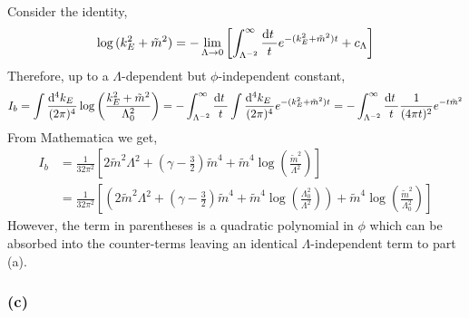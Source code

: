 \documentclass[12pt]{article}
\begin{document}
Consider the identity,
\[ \log{(k_E^2 + \tilde{m}^2)} = - \lim_{\Lambda \to 0} \left[ \int_{\Lambda^{-2}}^\infty \frac{\mathrm{d}t \:}{t} e^{-(k_E^2 + \tilde{m}^2) t} + c_{\Lambda} \right] \]
Therefore, up to a $\Lambda$-dependent but $\phi$-independent constant,
\[ I_b = \int \frac{\mathrm{d}^{4} k_E \:}{(2\pi)^4} \log{\left( \frac{k_E^2 + \tilde{m}^2}{\Lambda_0^2} \right)} = - \int_{\Lambda^{-2}}^{\infty} \frac{\mathrm{d}t \:}{t} \int \frac{\mathrm{d}^{4} k_E \:}{(2\pi)^4} e^{-(k_E^2 + \tilde{m}^2)t} = - \int_{\Lambda^{-2}}^{\infty} \frac{\mathrm{d}t \:}{t} \frac{1}{(4 \pi t)^2} e^{- t \tilde{m}^2} \]
From Mathematica we get,
\begin{align*}
I_b & = \frac{1}{32 \pi^2} \left[ 2 \tilde{m}^2 \Lambda^2 + (\gamma - \tfrac{3}{2}) \tilde{m}^4 + \tilde{m}^4 \log{\left( \frac{\tilde{m}^2}{\Lambda^2} \right)}   \right] 
\\
& = \frac{1}{32 \pi^2} \left[ \left( 2 \tilde{m}^2 \Lambda^2 + (\gamma - \tfrac{3}{2}) \tilde{m}^4 + \tilde{m}^4 \log{\left( \frac{\Lambda_0^2}{\Lambda^2} \right)} \right) + \tilde{m}^4 \log{\left( \frac{\tilde{m}^2}{\Lambda_0^2} \right)}  \right] 
\end{align*}
However, the term in parentheses is a quadratic polynomial in $\phi$ which can be absorbed into the counter-terms leaving an identical $\Lambda$-independent term to part (a). 

\subsubsection*{(c)}
\end{document}
